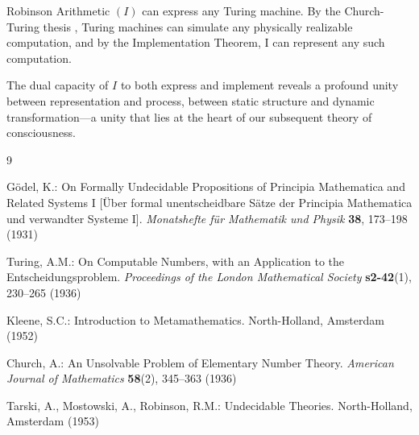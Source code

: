 \documentclass[runningheads]{llncs}
\begin{document}
	\medskip
    
    \medskip
    
    \begin{corollary}
        Robinson Arithmetic $(I)$ can express any Turing machine. By the Church-Turing thesis \cite{Church1936}, Turing machines can simulate any physically realizable computation, and by the Implementation Theorem, I can represent any such computation.
    \end{corollary}

    \medskip

    \noindent
    The dual capacity of $I$ to both express and implement reveals a profound unity between representation and process, between static structure and dynamic transformation—a unity that lies at the heart of our subsequent theory of consciousness.
	
	\begin{thebibliography}{9}
		
		Gödel, K.: On Formally Undecidable Propositions of Principia Mathematica and Related Systems I [Über formal unentscheidbare Sätze der Principia Mathematica und verwandter Systeme I]. \textit{Monatshefte für Mathematik und Physik} \textbf{38}, 173--198 (1931)
		
		Turing, A.M.: On Computable Numbers, with an Application to the Entscheidungsproblem. \textit{Proceedings of the London Mathematical Society} \textbf{s2-42}(1), 230--265 (1936)
		
		Kleene, S.C.: Introduction to Metamathematics. North-Holland, Amsterdam (1952)
		
		Church, A.: An Unsolvable Problem of Elementary Number Theory. \textit{American Journal of Mathematics} \textbf{58}(2), 345--363 (1936)
		
		Tarski, A., Mostowski, A., Robinson, R.M.: Undecidable Theories. North-Holland, Amsterdam (1953)
		
	\end{thebibliography}
	
\end{document}
